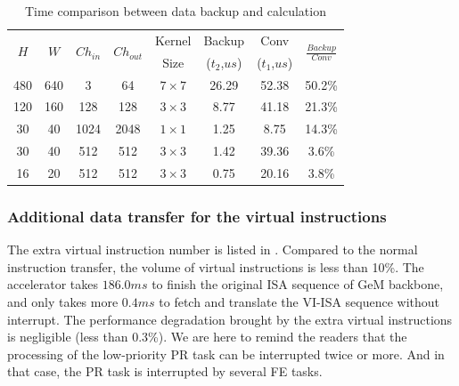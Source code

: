 \begin{table}[t]
  \centering
  \caption{Time comparison between data backup and calculation}
    \begin{tabular}{|c|c|c|c|c|c|c|c|}
    \hline
    \multirow{2}[2]{*}{$H$} & \multirow{2}[2]{*}{$W$} & \multirow{2}[2]{*}{$Ch_{in}$} & \multirow{2}[2]{*}{$Ch_{out}$} & Kernel & Backup & Conv  & \multirow{2}[2]{*}{$\frac{Backup}{Conv}$} \bigstrut[t]\\
          &       &       &       & Size  & ($t_2$,$us$)  & ($t_1$,$us$)  &  \\
    \hline
    480   & 640   & 3     & 64    & $7 \times 7$ & 26.29  & 52.38  & 50.2\% \\
    \hline
    120   & 160   & 128   & 128   & $3 \times 3$ & 8.77  & 41.18  & 21.3\% \\
    \hline
    30    & 40    & 1024  & 2048  & $1 \times 1$ & 1.25  & 8.75  & 14.3\% \\
    \hline
    30    & 40    & 512   & 512   & $3 \times 3$ & 1.42  & 39.36  & 3.6\% \\
    \hline
    16    & 20    & 512   & 512   & $3 \times 3$ & 0.75  & 20.16  & 3.8\% \\
    \hline
    \end{tabular}%
  \label{tab:timecompare}%
\end{table}%




\subsubsection{ Additional data transfer for the virtual instructions }

The extra virtual instruction number is listed in . Compared to the normal instruction transfer, the volume of virtual instructions is less than 10\%. The accelerator takes $186.0ms$ to finish the original ISA sequence of GeM backbone, and only takes more $0.4ms$ to fetch and translate the VI-ISA sequence without interrupt. The performance degradation brought by the extra virtual instructions is negligible (less than 0.3\%). 
We are here to remind the readers that the processing of the low-priority PR task can be interrupted twice or more. And in that case, the PR task is interrupted by several FE tasks.



